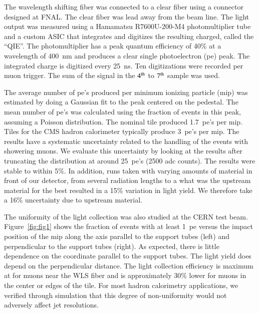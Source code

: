 \documentclass[review]{elsarticle}
\begin{document}
The wavelength shifting fiber was connected to a clear fiber using a
connector designed at FNAL. The clear fiber was lead away from the
beam line. The light output was measured using a Hamamatsu
R7600U-200-M4 photomultiplier tube and a custom ASIC that integrates
and digitizes the resulting charged, called the ``QIE''\cite{qie}.
The photomultiplier has a peak quantum efficiency of 40\% at a
wavelength of 400~nm and produces a clear single photoelectron (pe)
peak. The integrated charge is digitized every 25~ns. Ten
digitizations were recorded per muon trigger. The sum of the signal
in the ${\rm 4^{th}}$ to ${\rm 7^{th}}$ sample was used.

The average number of pe's produced per minimum ionizing particle
(mip) was estimated by doing a Gaussian fit to the peak centered on
the pedestal. The mean number of pe's was calculated using the
fraction of events in this peak, assuming a Poisson distribution. The
nominal tile produced 1.7~pe's per mip. Tiles for the CMS hadron
calorimeter typically produce 3~pe's per mip\cite{CMSHB}. The results
have a systematic uncertainty related to the handling of the events
with showering muons. We evaluate this uncertainty by looking at the
results after truncating the distribution at around 25~pe's (2500 adc
counts). The results were stable to within 5\%. In addition, runs
taken with varying amounts of material in front of our detector, from
several radiation lengths to a {\color{red} what was the upstream
 material for the best} resulted in a 15\% variation in light yield.
We therefore take a 16\% uncertainty due to upstream material.

The uniformity of the light collection was also studied at the CERN
test beam. Figure~\ref{fig:fig1} shows the fraction of events with at
least 1~pe versus the impact position of the mip along the axis
parallel to the support tubes (left) and perpendicular to the support
tubes (right). As expected, there is little dependence on the
coordinate parallel to the support tubes. The light yield does depend
on the perpendicular distance. The light collection efficiency is
maximum at for muons near the WLS fiber and is approximately 30\%
lower for muons in the center or edges of the tile. For most hadron
calorimetry applications, we verified through simulation that this
degree of non-uniformity would not adversely affect jet resolutions.
\end{document}
